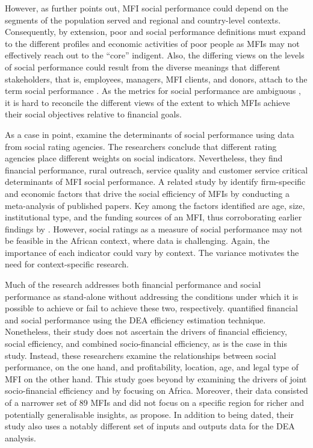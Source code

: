 \documentclass[a4paper, nobind]{templates/ociamthesis}
\begin{document}
However, as \textcite{morduch2000microfinance} further points out, MFI social performance could depend on the segments of the population served and regional and country-level contexts. Consequently, by extension, poor and social performance definitions must expand to the different profiles and economic activities of poor people as MFIs may not effectively reach out to the ``core'' indigent. Also, the differing views on the levels of social performance could result from the diverse meanings that different stakeholders, that is, employees, managers, MFI clients, and donors, attach to the term social performance \autocite{marti2016financial}. As the metrics for social performance are ambiguous \autocite{nason2018behavioral}, it is hard to reconcile the different views of the extent to which MFIs achieve their social objectives relative to financial goals.

As a case in point, \textcite{beisland2020measuring} examine the determinants of social performance using data from social rating agencies. The researchers conclude that different rating agencies place different weights on social indicators. Nevertheless, they find financial performance, rural outreach, service quality and customer service critical determinants of MFI social performance. A related study by \textcite{hermes2018determinants} identify firm-specific and economic factors that drive the social efficiency of MFIs by conducting a meta-analysis of published papers. Key among the factors identified are age, size, institutional type, and the funding sources of an MFI, thus corroborating earlier findings by \textcite{gutierrez2009social}. However, social ratings as a measure of social performance may not be feasible in the African context, where data is challenging. Again, the importance of each indicator could vary by context. The variance motivates the need for context-specific research.

Much of the research addresses both financial performance and social performance as stand-alone without addressing the conditions under which it is possible to achieve or fail to achieve these two, respectively. \textcite{gutierrez2009social} quantified financial and social performance using the DEA efficiency estimation technique. Nonetheless, their study does not ascertain the drivers of financial efficiency, social efficiency, and combined socio-financial efficiency, as is the case in this study. Instead, these researchers examine the relationships between social performance, on the one hand, and profitability, location, age, and legal type of MFI on the other hand. This study goes beyond \textcite{gutierrez2009social} by examining the drivers of joint socio-financial efficiency and by focusing on Africa. Moreover, their data consisted of a narrower set of 89 MFIs and did not focus on a specific region for richer and potentially generalisable insights, as \textcite{d2017ngos} propose. In addition to being dated, their study also uses a notably different set of inputs and outputs data for the DEA analysis.
\end{document}
